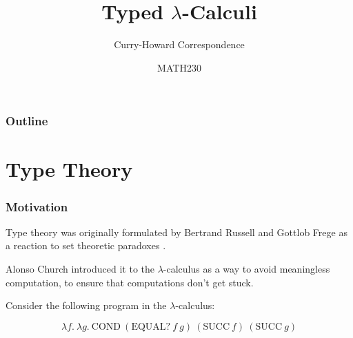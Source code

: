 \documentclass{beamer}
\title{Typed $\lambda$-Calculi}
\subtitle{Curry-Howard Correspondence}
\author{MATH230}
\institute{Te Kura P\=angarau \\ Te Whare W\=ananga o Waitaha}
\date{}
\theoremstyle{indentDefn} \newtheorem{defn}[]{Definition}
\begin{document}
\begin{frame}

  \titlepage

\end{frame}

\begin{frame}
  \frametitle{Outline}

  \tableofcontents

\end{frame}

\section{Type Theory}

\begin{frame}
  \frametitle{Motivation}

  	Type theory was originally formulated by Bertrand Russell and Gottlob Frege as a reaction to set theoretic paradoxes \cite{sep-type-theory}. 
    
    Alonso Church introduced it to the $\lambda$-calculus as a way to avoid meaningless computation, to ensure that computations don't get stuck. 



    Consider the following program in the $\lambda$-calculus:


    $$\lambda f. \ \lambda g. \ \text{COND} \ (\text{EQUAL?} \ f \ g) \ (\text{SUCC} \ f) \ (\text{SUCC} \ g) $$

    \vspace{2cm}

\end{frame}
\end{document}
